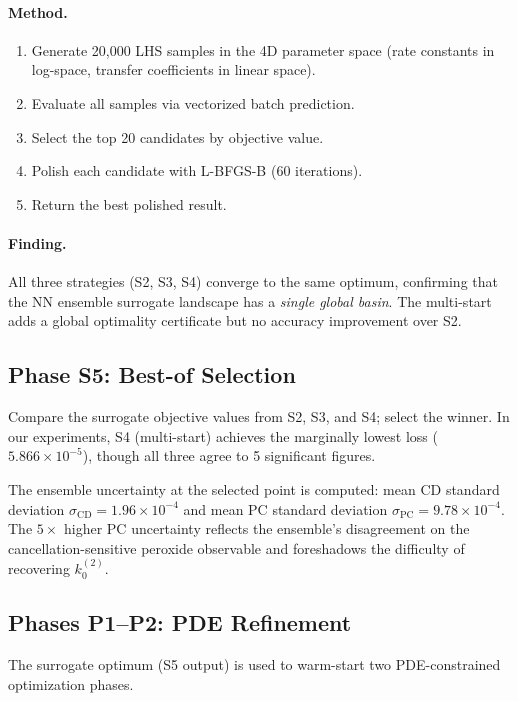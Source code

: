 \documentclass[11pt,a4paper]{article}
\newcommand{\kzero}{k_0}
\begin{document}
\paragraph{Method.}
\begin{enumerate}
  \item Generate 20,000 LHS samples in the 4D parameter space (rate
    constants in log-space, transfer coefficients in linear space).
  \item Evaluate all samples via vectorized batch prediction.
  \item Select the top 20 candidates by objective value.
  \item Polish each candidate with L-BFGS-B (60 iterations).
  \item Return the best polished result.
\end{enumerate}

\paragraph{Finding.} All three strategies (S2, S3, S4) converge to the
same optimum, confirming that the NN ensemble surrogate landscape has a
\emph{single global basin}. The multi-start adds a global optimality
certificate but no accuracy improvement over S2.

\subsection{Phase S5: Best-of Selection}\label{sec:S5}

Compare the surrogate objective values from S2, S3, and S4; select the
winner. In our experiments, S4 (multi-start) achieves the marginally
lowest loss ($5.866 \times 10^{-5}$), though all three agree to 5
significant figures.

The ensemble uncertainty at the selected point is computed:
mean CD standard deviation $\sigma_{\mathrm{CD}} = 1.96 \times 10^{-4}$
and mean PC standard deviation $\sigma_{\mathrm{PC}} = 9.78 \times 10^{-4}$.
The $5\times$ higher PC uncertainty reflects the ensemble's disagreement
on the cancellation-sensitive peroxide observable and foreshadows the
difficulty of recovering $\kzero^{(2)}$.

\subsection{Phases P1--P2: PDE Refinement}\label{sec:PDE_phases}

The surrogate optimum (S5 output) is used to warm-start two PDE-constrained
optimization phases.
\end{document}
